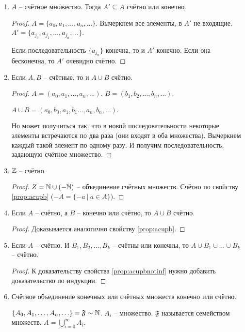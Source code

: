 \begin{enumerate}
	\item
	\label{prop:AsubsetA}
	$A$ -- счётное множество. Тогда $A' \subseteq A$ счётно или конечно.
	\begin{proof}
		$A = \{a_0, a_1, \ldots, a_n, \ldots\}$. Вычеркнем все элементы, в $A'$
		не входящие. $A' = \{a_{j_0}, a_{j_1}, \ldots, a_{j_n}, \ldots\}$.
		
		Если последовательность $\{a_{j_n}\}$ конечна, то и $A'$ конечно.
		Если она бесконечна, то $A'$ очевидно счётно.
	\end{proof}
	\item 
	\label{prop:acupb}
	Если $A,B$ -- счётные, то и $A \cup B$ счётно.
	\begin{proof}
		$A = (a_0, a_1, \ldots, a_n, \ldots)$. 
		$B = (b_1, b_2, \ldots, b_n, \ldots)$.
		
		$A \cup B = (a_0, b_0, a_1, b_1 \ldots, a_n, b_n, \ldots)$.
		
		Но может получиться так, что в новой последовательности некоторые элементы
		встречаются по два раза (они входят в оба множества). Вычеркнем
		каждый такой элемент по одному разу. И получим последовательность,
		задающую счётное множество.
	\end{proof}
	\item $\mathbb{Z}$ -- счётно.
	\begin{proof}
		$Z = \mathbb{N} \cup (-\mathbb{N})$ -- объединение счётных множеств. Счётно по свойству
		\ref{prop:acupb} ($-A = \{-a \ |\ a \in A\}$).
	\end{proof}
	\item 
	\label{prop:acupbnotinf}
	Если $A$ -- счётно, а $B$ -- конечно или счётно, то $A \cup B$ счётно.
	\begin{proof}
		Доказывается аналогично свойству \ref{prop:acupb}.
	\end{proof}
	\item Если $A$ -- счётно. И $B_1, B_2, \ldots, B_k$ -- счётны или конечны, то
	$A \cup B_1 \cup \ldots \cup B_k$ -- счётно.
	\begin{proof}
		К доказательству свойства \ref{prop:acupbnotinf} нужно добавить
		доказательство по индукции.
	\end{proof}
	\item
	\label{prop:Fsetcup}
	Счётное объединение конечных или счётных множеств конечно или счётно.
	
	$\{A_0, A_1, \ldots, A_n, \ldots\} = \mathfrak{F} \sim \mathbb{N}$. $A_i$ -- множество.
	$\mathfrak{F}$ называется семейством множеств. 
	$A = \bigcup\limits_{i=0}^{\infty} A_i$.
	

\end{enumerate}
